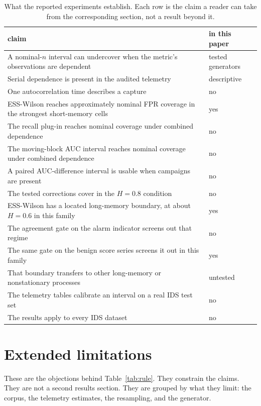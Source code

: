 \documentclass[a4paper,fleqn]{cas-dc}
\newcommand{\tabwidth}{\columnwidth}
\newcommand{\tabbody}{\small\setlength{\tabcolsep}{3.5pt}\renewcommand{\arraystretch}{1.08}}
\newcommand{\fulltab}{\renewcommand{\tabwidth}{\textwidth}\tabbody}
\begin{document}
\begin{table}[!t]
\centering
\caption{What the reported experiments establish. Each row is the claim a reader can take from the
corresponding section, not a result beyond it.}\label{tab:scope}
\fulltab
\begin{tabularx}{\textwidth}{@{}>{\raggedright\arraybackslash}X l@{}}
\toprule
claim & in this paper\\
\midrule
A nominal-$n$ interval can undercover when the metric's observations are dependent & tested generators\\
Serial dependence is present in the audited telemetry & descriptive\\
One autocorrelation time describes a capture & no\\
ESS-Wilson reaches approximately nominal FPR coverage in the strongest short-memory cells & yes\\
The recall plug-in reaches nominal coverage under combined dependence & no\\
The moving-block AUC interval reaches nominal coverage under combined dependence & no\\
A paired AUC-difference interval is usable when campaigns are present & no\\
The tested corrections cover in the $H{=}0.8$ condition & no\\
ESS-Wilson has a located long-memory boundary, at about $H{=}0.6$ in this family & yes\\
The agreement gate on the alarm indicator screens out that regime & no\\
The same gate on the benign score series screens it out in this family & yes\\
That boundary transfers to other long-memory or nonstationary processes & untested\\
The telemetry tables calibrate an interval on a real IDS test set & no\\
The results apply to every IDS dataset & no\\
\bottomrule
\end{tabularx}
\end{table}


\FloatBarrier
\appendix
\section{Extended limitations}\label{app:limits}
These are the objections behind Table~\ref{tab:rule}. They constrain the claims. They are not a
second results section. They are grouped by what they limit: the corpus, the telemetry estimates,
the resampling, and the generator.
\end{document}
